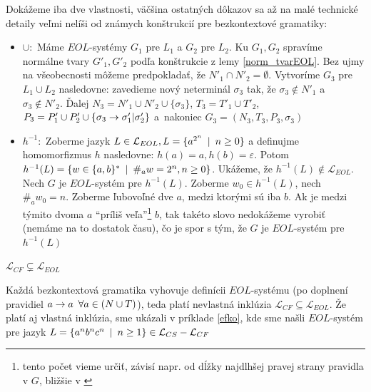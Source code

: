 \begin{dokaz}
    Dokážeme iba dve vlastnosti, väčšina ostatných dôkazov sa až na
    malé technické detaily veľmi nelíši od známych konštrukcií pre
    bezkontextové gramatiky:
    \begin{itemize}
    \item $\cup :$ Máme $EOL$-systémy $G_{1}$ pre $L_{1}$ a $G_{2}$
    pre $L_{2}$. Ku $G_{1},G_{2}$ spravíme normálne tvary
    $G'_{1},G'_{2}$ podľa konštrukcie z lemy \ref{norm_tvarEOL}. Bez
    ujmy na všeobecnosti môžeme predpokladať, že $N'_{1}\cap
    N'_{2}=\emptyset$. Vytvoríme $G_{3}$ pre $L_{1}\cup L_{2}$
    nasledovne: zavedieme nový neterminál $\sigma_{3}$ tak, že
    $\sigma_{3}\not\in N'_{1}$ \mbox{a $\sigma_{3}\not\in N'_{2}$}.
    Ďalej $N_{3}=N'_{1}\cup N'_{2}\cup\{\sigma_{3}\}$,
    $T_{3}=T'_{1}\cup T'_{2}$, $P_{3}=P'_{1}\cup
    P'_{2}\cup\{\sigma_{3}\rightarrow\sigma'_{1}|\sigma'_{2}\}$ \mbox{a
    nakoniec} $G_{3}=(N_{3},T_{3},P_{3},\sigma_{3})$
    \item $h^{-1} :$ Zoberme jazyk $L\in\mathcal{L}_{EOL},
    L=\{a^{2^n}\enspace |\enspace n\geq0\}$ a definujme homomorfizmus $h$ nasledovne:
    $h(a)=a, h(b)=\varepsilon$. Potom $h^{-1}(L)=\{w\in\{a,b\}^*\enspace |\enspace
    \#_a w=2^n,n\geq0\}$. Ukážeme, že
    $h^{-1}(L)\not\in\mathcal{L}_{EOL}$. Nech $G$ je $EOL$-systém pre
    $h^{-1}(L)$. Zoberme $w_0\in h^{-1}(L)$, nech $\#_a w_0=n$.
    Zoberme ľubovoľné dve $a$, medzi ktorými sú iba $b$. Ak je medzi
    týmito dvoma $a$ ``príliš veľa''\footnote{tento počet vieme určiť,
    závisí napr. od dĺžky najdlhšej pravej strany pravidla v $G$,
    bližšie v \cite{clos}} $b$, tak takéto slovo nedokážeme vyrobiť
    (nemáme na to dostatok času), čo je spor s tým, že $G$ je
    $EOL$-systém pre $h^{-1}(L)$
    \end{itemize}
\end{dokaz}

\begin{veta}
    $\mathcal{L}_{CF}\subsetneq\mathcal{L}_{EOL}$
\end{veta}

\begin{dokaz}
    Každá bezkontextová gramatika vyhovuje definícii $EOL$-systému (po
    doplnení pravidiel $a\rightarrow a\enspace\forall a\in(N\cup T)$), teda platí
    nevlastná inklúzia $\mathcal{L}_{CF}\subseteq\mathcal{L}_{EOL}$.
    Že platí aj vlastná inklúzia, sme ukázali v príklade \ref{efko},
    kde sme našli $EOL$-systém pre jazyk $L=\{a^{n}b^{n}c^{n}\enspace |\enspace
    n\geq1\}\in\mathcal{L}_{CS} - \mathcal{L}_{CF}$
\end{dokaz}

